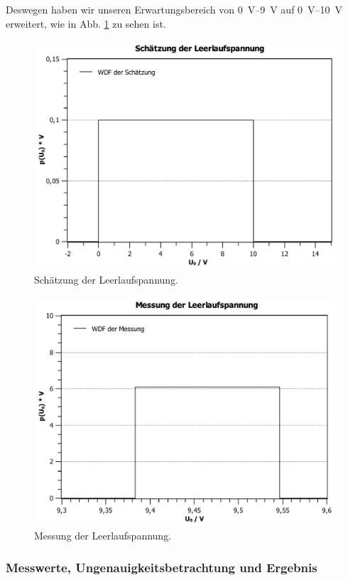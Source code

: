 \documentclass[11pt,a4paper,titlepage, ngerman]{article}
\begin{document}
				Deswegen haben wir unseren Erwartungsbereich von \SIrange{0}{9}{\V} auf \SIrange{0}{10}{\V} erweitert, wie in Abb. \ref{fig:spannung} zu sehen ist.			
				\begin{figure}
					\includegraphics[width=\textwidth]{Spannungsschaetzung_2.pdf}
					\caption{Schätzung der Leerlaufspannung.}
					\label{fig:spannung}
				\end{figure}		
				\begin{figure}
					\includegraphics[width=\textwidth]{Spannungsmessung_2.pdf}
					\caption{Messung der Leerlaufspannung.}
					\label{fig:spannung2}
				\end{figure}	
				
			\subsubsection{Messwerte, Ungenauigkeitsbetrachtung und Ergebnis}
				\label{2.1.2}	
					
\end{document}
